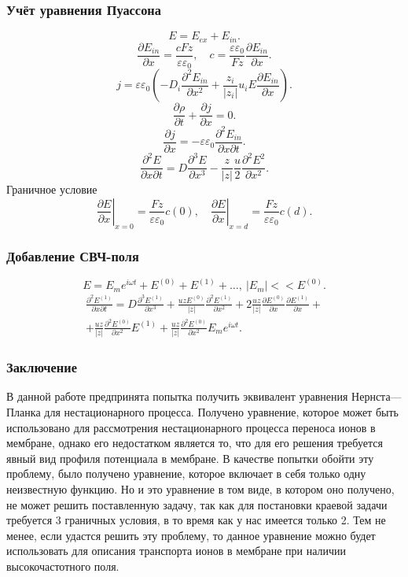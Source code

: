 \documentclass[10pt,pdf]{beamer}
\newcommand{\pder}[2] {\frac{\partial #1}{\partial #2}}
\newcommand{\ppder}[2]{\frac{\partial^2 #1}{\partial {#2}^2}}
\newcommand{\pcder}[3]{\frac{\partial^2 #1}{\partial #2 \partial #3}}
\newcommand{\abs}[1]{\left| #1 \right|}
\newcommand{\eps}{\varepsilon}
\begin{document}
  \begin{frame}
      \frametitle{Учёт уравнения Пуассона}
      \[
          E = E_{ex} + E_{in}.
      \]
      \[
        \pder{E_{in}}{x} = \frac{cFz}{\eps\eps_0},\quad
        c = \frac{\eps\eps_0}{Fz}\pder{E_{in}}{x}.
    \]
    \[
        j = \eps\eps_0
            \left(-D_i\ppder{E_{in}}{x}+\frac{z_i}{|z_i|}u_iE\pder{E_{in}}{x}\right).
        \label{eq:j_from_E}
    \]
    \[
        \pder{\rho}{t} + \pder{j}{x} = 0.
    \]
    \[
        \pder{j}{x} = -\eps\eps_0\pcder{E_{in}}{x}{t}.
        \label{eq:displacement-current}
    \]
    \[
        \pcder{E}{x}{t} = D\frac{\partial^3{E}}{\partial x^3} -
        \frac{z}{\abs{z}}\frac{u}{2}\ppder{E^2}{x}.
        \label{eq:epic-equation}
    \]
    Граничное условие
    \[
        \left.\pder{E}{x}\right|_{x=0} = \frac{Fz}{\eps\eps_0}c(0),\quad
        \left.\pder{E}{x}\right|_{x=d} = \frac{Fz}{\eps\eps_0}c(d).
    \]
    \end{frame}
  \begin{frame}
    \frametitle{Добавление СВЧ-поля}
    \[
        E = E_m e^{i\omega t} + E^{(0)} + E^{(1)} + \ldots,\ |E_m| << E^{(0)}.
    \]
    \begin{gather*}
    \pcder{E^{(1)}}{x}{t} = D\frac{\partial^3 E^{(1)}}{\partial x^3} +
    \frac{uzE^{(0)}}{\abs{z}}\ppder{E^{(1)}}{x} +
    2\frac{uz}{\abs{z}}\pder{E^{(0)}}{x}\pder{E^{(1)}}{x} +\\+
    \frac{uz}{\abs{z}}\ppder{E^{(0)}}{x} E^{(1)} +
    \frac{uz}{\abs{z}}\ppder{E^{(0)}}{x} E_m e^{i\omega t}.
\end{gather*}
  \end{frame}
  \begin{frame}
      \frametitle{Заключение}
      В данной работе предпринята попытка получить эквивалент уравнения
Нернста—Планка для нестационарного процесса. Получено уравнение, которое может быть использовано для рассмотрения нестационарного
процесса переноса ионов в мембране, однако его недостатком является то,
что для его решения требуется явный вид профиля потенциала в мембране. В
качестве попытки обойти эту проблему, было получено уравнение,
которое включает в себя только одну неизвестную функцию. Но и это
уравнение в том виде, в котором оно получено, не может решить
поставленную задачу, так как для постановки краевой задачи требуется 3
граничных условия, в то время как у нас имеется только 2. Тем не менее,
если удастся решить эту проблему, то данное уравнение можно будет
использовать для описания транспорта ионов в мембране при наличии
высокочастотного поля.
  \end{frame}
\end{document}
